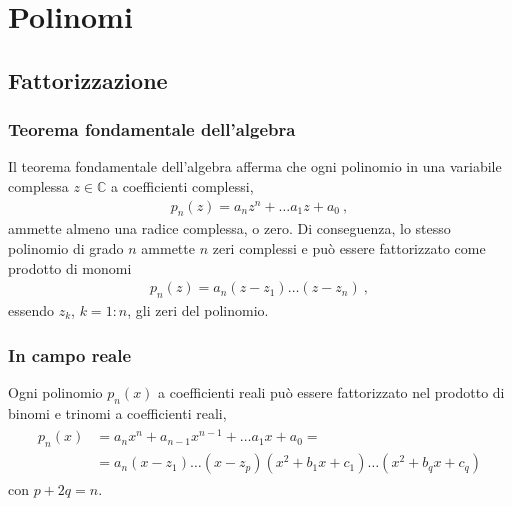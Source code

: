 \documentclass[letterpaper,10pt,italian]{jupyterBook}
\begin{document}
\chapter{Polinomi}
\label{\detokenize{ch/precalculus/polynomials:polinomi}}\label{\detokenize{ch/precalculus/polynomials:math-hs-precalculus-polynomials}}\label{\detokenize{ch/precalculus/polynomials::doc}}

\section{Fattorizzazione}
\label{\detokenize{ch/precalculus/polynomials:fattorizzazione}}
\sphinxAtStartPar
{} 


\subsection{Teorema fondamentale dell’algebra}
\label{\detokenize{ch/precalculus/polynomials:teorema-fondamentale-dell-algebra}}\label{\detokenize{ch/precalculus/polynomials:math-hs-precalculus-polynomials-alg-fund-thm}}
\sphinxAtStartPar
Il teorema fondamentale dell’algebra afferma che ogni polinomio in una variabile complessa \(z \in \mathbb{C}\) a coefficienti complessi,
\begin{equation*}
\begin{split}p_n(z) = a_n z^n + \dots a_1 z + a_0 \ ,\end{split}
\end{equation*}
\sphinxAtStartPar
ammette almeno una radice complessa, o zero. Di conseguenza, lo stesso polinomio di grado \(n\) ammette \(n\) zeri complessi e può essere fattorizzato come prodotto di monomi
\begin{equation*}
\begin{split}p_n(z) = a_n ( z - z_1 ) \dots ( z - z_n ) \ ,\end{split}
\end{equation*}
\sphinxAtStartPar
essendo \(z_k\), \(k=1:n\), gli zeri del polinomio.


\subsection{In campo reale}
\label{\detokenize{ch/precalculus/polynomials:in-campo-reale}}
\sphinxAtStartPar
Ogni polinomio \(p_n(x)\) a coefficienti reali può essere fattorizzato nel prodotto di binomi e trinomi a coefficienti reali,
\begin{equation*}
\begin{split}\begin{aligned}
  p_n(x) & = a_n x^n + a_{n-1} x^{n-1} + \dots a_1 x + a_0 = \\
         & =a_n ( x - z_1 ) \dots ( x - z_p ) ( x^2 + b_1 x + c_1 ) \dots ( x^2 + b_q x + c_q )
\end{aligned}\end{split}
\end{equation*}
\sphinxAtStartPar
con \(p + 2q = n\).
\end{document}
